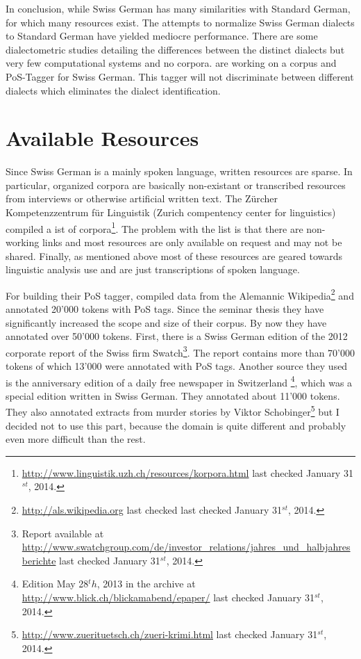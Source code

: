 \documentclass[11pt,letterpaper, covington]{article}
\begin{document}
In conclusion, while Swiss German has many similarities with Standard German, for which many resources exist. The attempts to normalize Swiss German dialects to Standard German have yielded mediocre performance. There are some dialectometric studies detailing the differences between the distinct dialects but very few computational systems and no corpora. \citet{AH14} are working on a corpus and PoS-Tagger for Swiss German. This tagger will not discriminate between different dialects which eliminates the dialect identification.

\section{Available Resources}

Since Swiss German is a mainly spoken language, written resources are sparse. In particular, organized corpora are basically non-existant or transcribed resources from interviews or otherwise artificial written text. The Zürcher Kompetenzzentrum für Linguistik (Zurich compentency center for linguistics) compiled a ist of corpora\footnote{\url{http://www.linguistik.uzh.ch/resources/korpora.html} last checked January 31$^{st}$, 2014.}. The problem with the list is that there are non-working links and most resources are only available on request and may not be shared. Finally, as mentioned above most of these resources are geared towards linguistic analysis use and are just transcriptions of spoken language. 

For building their PoS tagger, \citet{AH12} compiled data from the Alemannic Wikipedia\footnote{\url{http://als.wikipedia.org} last checked last checked January 31$^{st}$, 2014.} and annotated 20'000 tokens with PoS tags. Since the seminar thesis they have significantly increased the scope and size of their corpus. By now they have annotated over 50'000 tokens. First, there is a Swiss German edition of the 2012 corporate report of the Swiss firm Swatch\footnote{Report available at \url{http://www.swatchgroup.com/de/investor_relations/jahres_und_halbjahresberichte} last checked January 31$^{st}$, 2014.}. The report contains more than 70'000 tokens of which 13'000 were annotated with PoS tags. Another source they used is the anniversary edition of a daily free newspaper in Switzerland \footnote{Edition May 28$^th$, 2013 in the archive at \url{http://www.blick.ch/blickamabend/epaper/}  last checked January 31$^{st}$, 2014.}, which was a special edition written in Swiss German. They annotated about 11'000 tokens. They also annotated extracts from murder stories by Viktor Schobinger\footnote{\url{http://www.zuerituetsch.ch/zueri-krimi.html}  last checked January 31$^{st}$, 2014.} but I decided not to use this part, because the domain is quite different and probably even more difficult than the rest. \citep{AH14}
\end{document}
